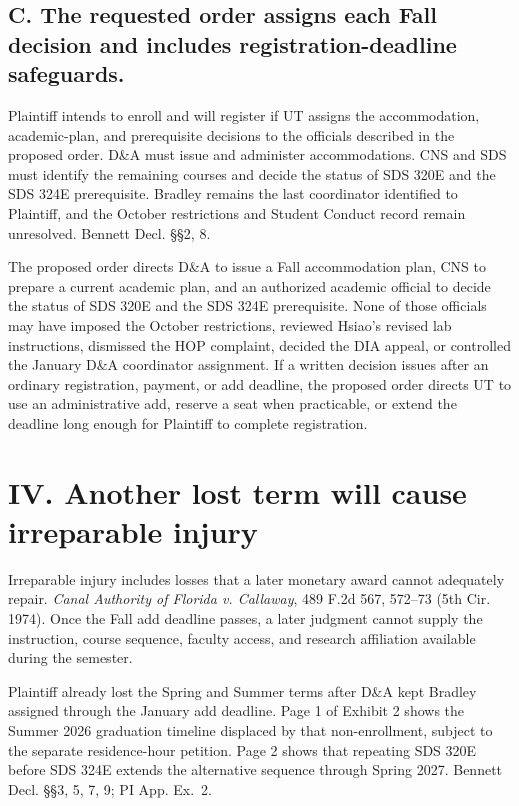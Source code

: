 \documentclass[12pt]{article}
\newcommand{\PIEx}[1]{PI App. Ex.~#1}
\begin{document}
\subsection*{C. The requested order assigns each Fall decision and includes registration-deadline safeguards.}
 
Plaintiff intends to enroll and will register if UT assigns the accommodation, academic-plan, and prerequisite decisions to the officials described in the proposed order. D\&A must issue and administer accommodations. CNS and SDS must identify the remaining courses and decide the status of SDS 320E and the SDS 324E prerequisite. Bradley remains the last coordinator identified to Plaintiff, and the October restrictions and Student Conduct record remain unresolved. Bennett Decl. \S\S 2, 8.
 
The proposed order directs D\&A to issue a Fall accommodation plan, CNS to prepare a current academic plan, and an authorized academic official to decide the status of SDS 320E and the SDS 324E prerequisite. None of those officials may have imposed the October restrictions, reviewed Hsiao's revised lab instructions, dismissed the HOP complaint, decided the DIA appeal, or controlled the January D\&A coordinator assignment. If a written decision issues after an ordinary registration, payment, or add deadline, the proposed order directs UT to use an administrative add, reserve a seat when practicable, or extend the deadline long enough for Plaintiff to complete registration.
 
\section*{IV. Another lost term will cause irreparable injury}
 
Irreparable injury includes losses that a later monetary award cannot adequately repair. \textit{Canal Authority of Florida v. Callaway}, 489 F.2d 567, 572--73 (5th Cir. 1974). Once the Fall add deadline passes, a later judgment cannot supply the instruction, course sequence, faculty access, and research affiliation available during the semester.
 
Plaintiff already lost the Spring and Summer terms after D\&A kept Bradley assigned through the January add deadline. Page 1 of Exhibit 2 shows the Summer 2026 graduation timeline displaced by that non-enrollment, subject to the separate residence-hour petition. Page 2 shows that repeating SDS 320E before SDS 324E extends the alternative sequence through Spring 2027. Bennett Decl. \S\S 3, 5, 7, 9; \PIEx{2}.
 
\end{document}
